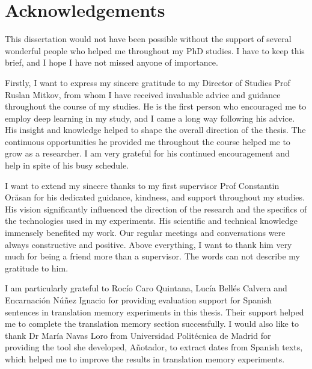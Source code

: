 
\chapter*{Acknowledgements}
This dissertation would not have been possible without the support of several wonderful people who helped me throughout my PhD studies. I have to keep this brief, and I hope I have not missed anyone of importance.

Firstly, I want to express my sincere gratitude to my Director of Studies Prof Ruslan Mitkov, from whom I have received invaluable advice and guidance throughout the course of my studies. He is the first person who encouraged me to employ deep learning in my study, and I came a long way following his advice. His insight and knowledge helped to shape the overall direction of the thesis. The continuous opportunities he provided me throughout the course helped me to grow as a researcher. I am very grateful for his continued encouragement and help in spite of his busy schedule.

I want to extend my sincere thanks to my first supervisor Prof Constantin Orăsan for his dedicated guidance, kindness, and support throughout my studies. His vision significantly influenced the direction of the research and the specifics of the technologies used in my experiments. His scientific and technical knowledge immensely benefited my work. Our regular meetings and conversations were always constructive and positive. Above everything, I want to thank him very much for being a friend more than a supervisor. The words can not describe my gratitude to him.

I am particularly grateful to Rocío Caro Quintana, Lucía Bellés Calvera and Encarnación Núñez Ignacio for providing evaluation support for Spanish sentences in translation memory experiments in this thesis. Their support helped me to complete the translation memory section successfully. I would also like to thank Dr María Navas Loro from Universidad Politécnica de Madrid for providing the tool she developed, Añotador, to extract dates from Spanish texts, which helped me to improve the results in translation memory experiments.


